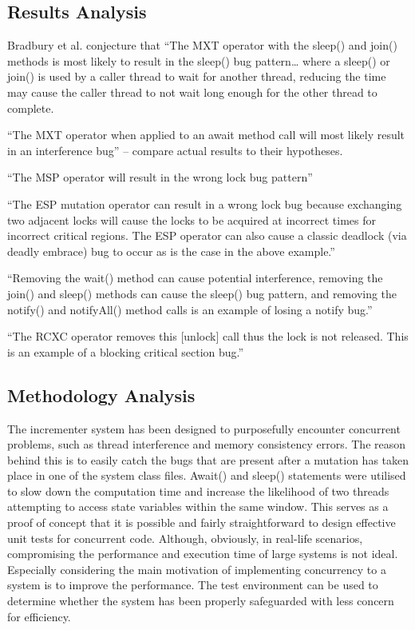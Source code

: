 \documentclass[a4paper,12pt]{article}
\begin{document}
    \subsection{Results Analysis}

Bradbury et al. conjecture that “The MXT operator with the sleep() and join() methods is most likely to result in the sleep() bug pattern… where a sleep() or join() is used by a caller thread to wait for another thread, reducing the time may cause the caller thread to not wait long enough for the other thread to complete.  

“The MXT operator when applied to an await method call will most likely result in an interference bug” – compare actual results to their hypotheses.

“The MSP operator will result in the wrong lock bug pattern”

“The ESP mutation operator can result in a wrong lock bug because exchanging two adjacent locks will cause the locks to be acquired at incorrect times for incorrect critical regions. The ESP operator can also cause a classic deadlock (via deadly embrace) bug to occur as is the case in the above example.”

“Removing the wait() method can cause potential interference, removing the join() and sleep() methods can cause the sleep() bug pattern, and removing the notify() and notifyAll() method calls is an example of losing a notify bug.”

“The RCXC operator removes this [unlock] call thus the lock is not released. This is an example of a blocking critical section bug.”

    
    
    
    
    \subsection{Methodology Analysis}

The incrementer system has been designed to purposefully encounter concurrent problems, such as thread interference and memory consistency errors. The reason behind this is to easily catch the bugs that are present after a mutation has taken place in one of the system class files. Await() and sleep() statements were utilised to slow down the computation time and increase the likelihood of two threads attempting to access state variables within the same window. This serves as a proof of concept that it is possible and fairly straightforward to design effective unit tests for concurrent code. Although, obviously, in real-life scenarios, compromising the performance and execution time of large systems is not ideal. Especially considering the main motivation of implementing concurrency to a system is to improve the performance. The test environment can be used to determine whether the system has been properly safeguarded with less concern for efficiency.
\end{document}
